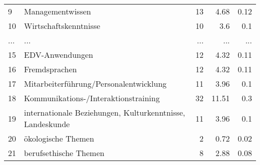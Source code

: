 \begin{longtable}{lXrrr}
        9 & \multicolumn{1}{X}{Managementwissen} & %
          \num{13} &
          \num[round-mode=places,round-precision=2]{4.68} &
          \num[round-mode=places,round-precision=2]{0.12} \\
        10 & \multicolumn{1}{X}{Wirtschaftskenntnisse} & %
          \num{10} &
          \num[round-mode=places,round-precision=2]{3.6} &
          \num[round-mode=places,round-precision=2]{0.1} \\
       ... & ... & ... & ... & ... \\
        15 & \multicolumn{1}{X}{EDV-Anwendungen} & %
          \num{12} &
          \num[round-mode=places,round-precision=2]{4.32} &
          \num[round-mode=places,round-precision=2]{0.11} \\

        16 & \multicolumn{1}{X}{Fremdsprachen} & %
          \num{12} &
          \num[round-mode=places,round-precision=2]{4.32} &
          \num[round-mode=places,round-precision=2]{0.11} \\

        17 & \multicolumn{1}{X}{Mitarbeiterführung/Personalentwicklung} & %
          \num{11} &
          \num[round-mode=places,round-precision=2]{3.96} &
          \num[round-mode=places,round-precision=2]{0.1} \\

        18 & \multicolumn{1}{X}{Kommunikations-/Interaktionstraining} & %
          \num{32} &
          \num[round-mode=places,round-precision=2]{11.51} &
          \num[round-mode=places,round-precision=2]{0.3} \\

        19 & \multicolumn{1}{X}{internationale Beziehungen, Kulturkenntnisse, Landeskunde} & %
          \num{11} &
          \num[round-mode=places,round-precision=2]{3.96} &
          \num[round-mode=places,round-precision=2]{0.1} \\

        20 & \multicolumn{1}{X}{ökologische Themen} & %
          \num{2} &
          \num[round-mode=places,round-precision=2]{0.72} &
          \num[round-mode=places,round-precision=2]{0.02} \\

        21 & \multicolumn{1}{X}{berufsethische Themen} & %
          \num{8} &
          \num[round-mode=places,round-precision=2]{2.88} &
          \num[round-mode=places,round-precision=2]{0.08} \\


\end{longtable}
